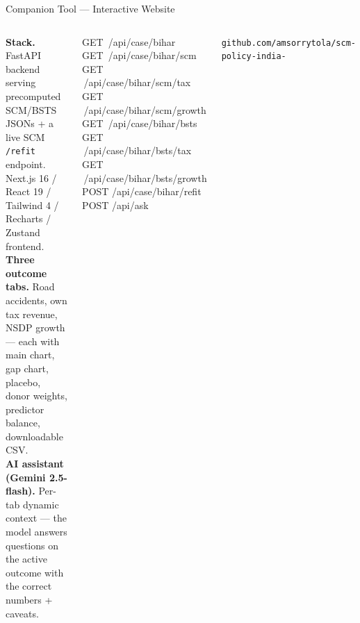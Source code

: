 \documentclass[aspectratio=169,11pt]{beamer}
\newcommand{\toptight}{\vspace{-0.15cm}}
\begin{document}
\begin{frame}{Companion Tool --- Interactive Website}
  \toptight
  \begin{columns}[T,onlytextwidth]
      \begin{tcolorbox}[navybox,title={\faGlobe\enspace Live, reproducible deck}]
        \scriptsize
        \textbf{Stack.} FastAPI backend serving precomputed SCM/BSTS JSONs
        + a live SCM \texttt{/refit} endpoint. Next.js 16 / React 19 /
        Tailwind 4 / Recharts / Zustand frontend.
        \vspace{0.15cm}\\
        \textbf{Three outcome tabs.} Road accidents, own tax revenue,
        NSDP growth --- each with main chart, gap chart, placebo, donor
        weights, predictor balance, downloadable CSV.
        \vspace{0.15cm}\\
        \textbf{AI assistant (Gemini 2.5-flash).} Per-tab dynamic context ---
        the model answers questions on the active outcome with the correct
        numbers + caveats.
      \end{tcolorbox}

      \begin{tcolorbox}[amberbox,title={\faTerminal\enspace Endpoints}]
        \tiny\ttfamily
        GET \,/api/case/bihar\\
        GET \,/api/case/bihar/scm\\
        GET \,/api/case/bihar/scm/tax\\
        GET \,/api/case/bihar/scm/growth\\
        GET \,/api/case/bihar/bsts\\
        GET \,/api/case/bihar/bsts/tax\\
        GET \,/api/case/bihar/bsts/growth\\
        POST /api/case/bihar/refit\\
        POST /api/ask
      \end{tcolorbox}
      \vspace{0.18cm}
      \begin{tcolorbox}[graybox]
        \tiny \faGithub\enspace
        \texttt{github.com/amsorrytola/scm-policy-india-}
      \end{tcolorbox}
  \end{columns}
\end{frame}
\end{document}
